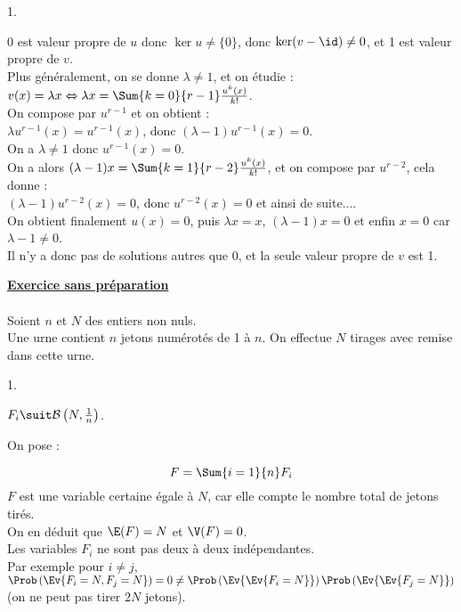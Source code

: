 \documentclass[11pt]{article}%
\begin{document}
\begin{exercice}
\begin{noliste}{1.}
 \item 0 est valeur propre de $u$ donc $\ker u \neq \{0 \}$, donc $\ker
(v - \id) \neq 0$, et 1 est valeur propre de $v$. \\
 Plus généralement, on se donne $\lambda \neq 1$, et on étudie : \\
 $v(x) = \lambda x \Leftrightarrow \lambda x = \Sum{k = 0}{r-1}
\frac{u^{k} (x)}{k!}$. \\
 On compose par $u^{r-1}$ et on obtient : \\
 $\lambda u^{r-1} (x) = u^{r-1} (x)$, donc $( \lambda -1) u^{r-1} (x) =
0$. \\
 On a $\lambda \neq 1$ donc $u^{r-1} (x) = 0$. \\
 On a alors $(\lambda -1) x = \Sum{k = 1}{r-2} \frac{u^{k} (x)}{k!}$,
et on compose par $u^{r-2}$, cela donne : \\
 $(\lambda -1) u^{r-2} (x) = 0$, donc $u^{r-2} (x) = 0$ et ainsi de
suite.... \\
 On obtient finalement $u(x) = 0$, puis $\lambda x = x$, $(\lambda -1)
x = 0$ et enfin $x = 0$ car $\lambda -1 \neq 0$. \\
 Il n'y a donc pas de solutions autres que 0, et la seule valeur propre
de $v$ est 1. \\
 \end{noliste}

 

 \noindent \textbf{\underline{Exercice sans préparation}} \\
\\
 Soient $n$ et $N$ des entiers non nuls. \\
 Une urne contient $n$ jetons numérotés de 1 à $n$. On effectue $ N $
tirages avec remise dans cette urne.

 \begin{noliste}{1.}
 \setlength{\itemsep}{4mm}
 \item $F_{i} \suit \mathcal{B} \left(N, \frac{1}{n} \right)$.

 On pose : 
 
\[
 F = \Sum{i = 1}{n}F_{i}
\]
 $F$ est une variable certaine égale à $N$, car elle compte le nombre
total de jetons tirés. \\
 On en déduit que $\E(F) = N$ et $\V(F) = 0$. \\

 Les variables $F_{i}$ ne sont pas deux à deux indépendantes. \\
 Par exemple pour $i \neq j$, $\Prob\left(\Ev{ F_{i} = N, F_{j} =
N}\right) = 0 \neq \Prob\left(\Ev{\Ev{ F_{i} = N}}\right)
\Prob\left(\Ev{\Ev{ F_{j} = N}}\right)$ (on ne peut pas tirer $2 N$
jetons). \\


\end{noliste}
\end{exercice}
\end{document}
